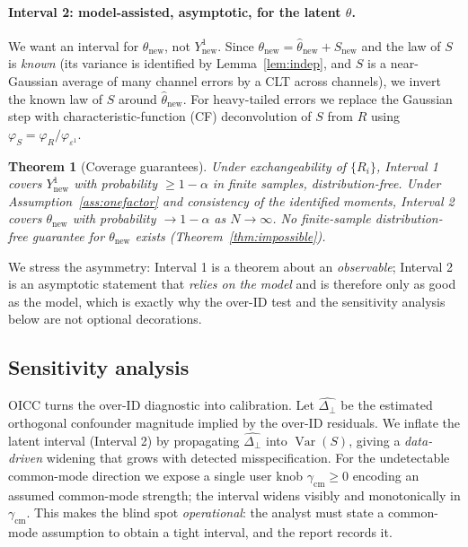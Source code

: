\documentclass[11pt]{article}
\newtheorem{theorem}{Theorem}
\theoremstyle{definition}
\theoremstyle{remark}
\newcommand{\Var}{\operatorname{Var}}
\newcommand{\thh}{\widehat{\theta}}
\newcommand{\eps}{\varepsilon}
\newcommand{\dperp}{\Delta_{\perp}}
\begin{document}
\paragraph{Interval 2: model-assisted, asymptotic, for the latent $\theta$.}
We want an interval for $\theta_{\text{new}}$, not $Y^1_{\text{new}}$. Since
$\theta_{\text{new}} = \thh_{\text{new}} + S_{\text{new}}$ and the law of $S$
is \emph{known} (its variance is identified by Lemma~\ref{lem:indep}, and $S$
is a near-Gaussian average of many channel errors by a CLT across channels),
we invert the known law of $S$ around $\thh_{\text{new}}$. For heavy-tailed
errors we replace the Gaussian step with characteristic-function (CF)
deconvolution of $S$ from $R$ using
$\varphi_S = \varphi_R / \varphi_{\eps^1}$.

\begin{theorem}[Coverage guarantees]\label{thm:coverage}
Under exchangeability of $\{R_i\}$, Interval 1 covers $Y^1_{\text{new}}$ with
probability $\ge 1-\alpha$ in finite samples, distribution-free. Under
Assumption~\ref{ass:onefactor} and consistency of the identified moments,
Interval 2 covers $\theta_{\text{new}}$ with probability $\to 1-\alpha$ as
$N\to\infty$. No finite-sample distribution-free guarantee for
$\theta_{\text{new}}$ exists (Theorem~\ref{thm:impossible}).
\end{theorem}

We stress the asymmetry: Interval 1 is a theorem about an \emph{observable};
Interval 2 is an asymptotic statement that \emph{relies on the model} and is
therefore only as good as the model, which is exactly why the over-ID test
and the sensitivity analysis below are not optional decorations.

\subsection{Sensitivity analysis}\label{sec:sensitivity}

OICC turns the over-ID diagnostic into calibration. Let $\widehat{\dperp}$ be
the estimated orthogonal confounder magnitude implied by the over-ID
residuals. We inflate the latent interval (Interval 2) by propagating
$\widehat{\dperp}$ into $\Var(S)$, giving a \emph{data-driven} widening that
grows with detected misspecification. For the undetectable common-mode
direction we expose a single user knob $\gamma_{\text{cm}}\ge 0$ encoding an
assumed common-mode strength; the interval widens visibly and monotonically
in $\gamma_{\text{cm}}$. This makes the blind spot \emph{operational}: the
analyst must state a common-mode assumption to obtain a tight interval, and
the report records it.
\end{document}
